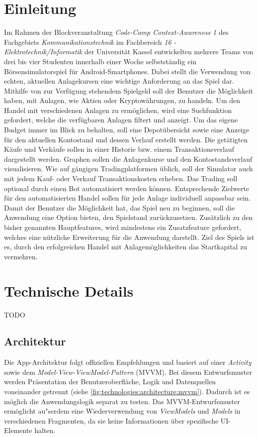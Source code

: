 \documentclass[a4paper]{article}
\begin{document}
\section{Einleitung}
\label{sec:introduction}
Im Rahmen der Blockveranstaltung \textit{Code-Camp Context-Awareness 1} des Fachgebiets \textit{Kommunikationstechnik} im Fachbereich \textit{16 - Elektrotechnik/Informatik} der Universität Kassel entwickelten mehrere Teams von drei bis vier Studenten innerhalb einer Woche selbstständig ein Börsensimulatorspiel für Android-Smartphones. Dabei stellt die Verwendung von echten, aktuellen Anlagekursen eine wichtige Anforderung an das Spiel dar. Mithilfe von zur Verfügung stehendem Spielgeld soll der Benutzer die Möglichkeit haben, mit Anlagen, wie Aktien oder Kryptowährungen, zu handeln. Um den Handel mit verschiedenen Anlagen zu ermöglichen, wird eine Suchfunktion gefordert, welche die verfügbaren Anlagen filtert und anzeigt. Um das eigene Budget immer im Blick zu behalten, soll eine Depotübersicht sowie eine Anzeige für den aktuellen Kontostand und dessen Verlauf erstellt werden. Die getätigten Käufe und Verkäufe sollen in einer Historie bzw. einem Transaktionsverlauf dargestellt werden. Graphen sollen die Anlagenkurse und den Kontostandsverlauf visualisieren. Wie auf gängigen Tradingplatformen üblich, soll der Simulator auch mit jedem Kauf- oder Verkauf Transaktionskosten erheben. Das Trading soll optional durch einen Bot automatisiert werden können. Entsprechende Zielwerte für den automatisierten Handel sollen für jede Anlage individuell anpassbar sein. Damit der Benutzer die Möglichkeit hat, das Spiel neu zu beginnen, soll die Anwendung eine Option bieten, den Spielstand zurückzusetzen. Zusätzlich zu den bisher genannten Hauptfeatures, wird mindestens ein Zusatzfeature gefordert, welches eine nützliche Erweiterung für die Anwendung darstellt. Ziel des Spiels ist es, durch den erfolgreichen Handel mit Anlagemöglichkeiten das Startkapital zu vermehren.


\section{Technische Details}
\label{sec:technologies}
TODO


\subsection{Architektur}
\label{subsec:technologies:architecture}
Die App-Architektur folgt offiziellen Empfehlungen \autocite{google_recommendations} und basiert auf einer \textit{Activity} sowie dem \textit{Model-View-ViewModel-Pattern} (MVVM).
Bei diesem Entwurfsmuster werden Präsentation der Benutzeroberfläche, Logik und Datenquellen voneinander getrennt (siehe \autoref{fig:technologies:architecture:mvvm}).
Dadurch ist es möglich die Anwendungslogik separat zu testen.
Das MVVM-Entwurfsmuster ermöglicht au"serdem eine Wiederverwendung von \textit{ViewModels} und \textit{Models} in verschiedenen Fragmenten, da sie keine Informationen über spezifische UI-Elemente halten.
\end{document}
